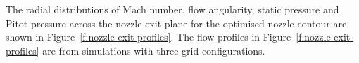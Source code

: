 \documentclass[12pt,a4paper]{article}
\begin{document}
The radial distributions of Mach number, flow angularity, static pressure 
and Pitot pressure across the nozzle-exit plane for the optimised nozzle 
contour are shown in Figure~\ref{f:nozzle-exit-profiles}. The flow profiles
in Figure~\ref{f:nozzle-exit-profiles} are from simulations with three
grid configurations.
%
\begin{figure}[htbp]
 \begin{center}
  \quad
\end{center}
\end{figure}
\end{document}
